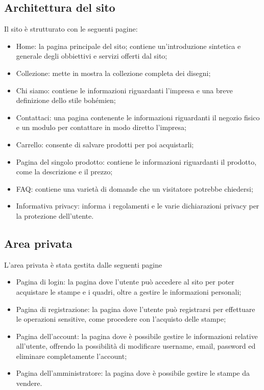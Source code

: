 \documentclass[11pt]{article}
\begin{document}
\subsection{Architettura del sito}
\label{sec:org6fecc12}
Il sito è strutturato con le seguenti pagine:
\begin{itemize}
\item Home: la pagina principale del sito; contiene un'introduzione sintetica e generale degli obbiettivi e servizi offerti dal sito;
\item Collezione: mette in mostra la collezione completa dei disegni;
\item Chi siamo: contiene le informazioni riguardanti l'impresa e una breve definizione dello stile bohémien;
\item Contattaci: una pagina contenente le informazioni riguardanti il negozio fisico e un modulo per contattare in modo diretto l'impresa;
\item Carrello: consente di salvare prodotti per poi acquistarli;
\item Pagina del singolo prodotto: contiene le informazioni riguardanti il prodotto, come la descrizione e il prezzo;
\item FAQ: contiene una varietà di domande che un visitatore potrebbe chiedersi;
\item Informativa privacy: informa i regolamenti e le varie dichiarazioni privacy per la protezione dell'utente.
\end{itemize}
\subsection{Area privata}
\label{sec:org210ea75}
L'area privata è stata gestita dalle seguenti pagine
\begin{itemize}
\item Pagina di login: la pagina dove l'utente può accedere al sito per poter acquistare le stampe e i quadri, oltre a gestire le informazioni personali;
\item Pagina di registrazione: la pagina dove l'utente può registrarsi per effettuare le operazioni sensitive, come procedere con l'acquisto delle stampe;
\item Pagina dell'account: la pagina dove è possibile gestire le informazioni relative all'utente, offrendo la possibilità di modificare username, email, password ed eliminare completamente l'account;
\item Pagina dell'amministratore: la pagina dove è possibile gestire le stampe da vendere.
\end{itemize}
\end{document}
